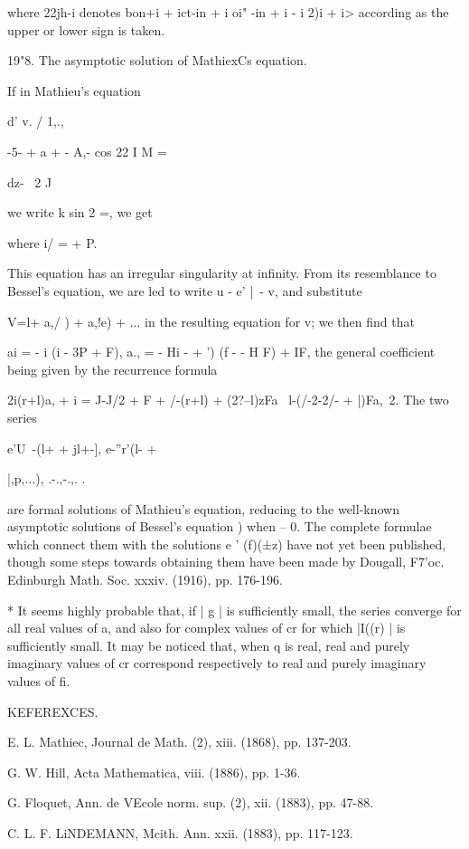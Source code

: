 {{where 22jh-i denotes bon+i + ict-in + i oi" -in + i - i 2)i + i>
according as the upper or lower sign is taken.

19"8. The asymptotic solution of MathiexCs equation.

If in Mathieu's equation

d' v. / 1,., \

-5- + a + - A,- cos 22 I M =

dz- \ 2 J

we write k sin 2 =, we get

where i/ = + P.

This equation has an irregular singularity at infinity. From its
resemblance to Bessel's equation, we are led to write u - e' |~- v,
and substitute

V=l+ a,/ ) + a,!e) + ... in the resulting equation for v; we then
find that

ai = - i (i - 3P + F), a., = - Hi - + ') (f - - H F) + IF, the
general coefficient being given by the recurrence formula

2i(r+l)a, + i = J-J/2 + F + /-(r+l) + (2?--l)zFa \ l-(/-2-2/- + |)Fa,\
2. The two series

e'U~-(l+ + jl+-], e-''r'(l- +

|,p,...), .-.,-.,. . \

are formal solutions of Mathieu's equation, reducing to the well-known
asymptotic solutions of Bessel's equation \hardsectionref{17}{5}) when -- 0. The
complete formulae which connect them with the solutions e ' (f)(±z)
have not yet been published, though some steps towards obtaining them
have been made by Dougall, F7'oc. Edinburgh Math. Soc. xxxiv. (1916),
pp. 176-196.

* It seems highly probable that, if | g | is sufficiently small, the
series converge for all real values of a, and also for complex values
of cr for which |I((r) | is sufficiently small. It may be noticed
that, when q is real, real and purely imaginary values of cr
correspond respectively to real and purely imaginary values of fi.

%
%

KEFEREXCES.

E. L. Mathiec, Journal de Math. (2), xiii. (1868), pp. 137-203.

G. W. Hill, Acta Mathematica, viii. (1886), pp. 1-36.

G. Floquet, Ann. de VEcole norm. sup. (2), xii. (1883), pp. 47-88.

C. L. F. LiNDEMANN, Mcith. Ann. xxii. (1883), pp. 117-123.

}}
